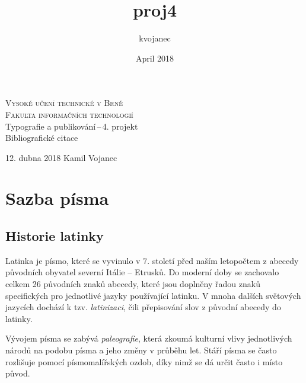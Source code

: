 \documentclass{article}
\title{proj4}
\author{kvojanec }
\date{April 2018}
\begin{document}
\begin{titlepage}
\begin{center}
\Huge
\textsc{\Huge{Vysoké učení technické v Brně} \\\huge Fakulta informačních technologií}\\
\LARGE Typografie a publikování\,--\,4. projekt\\
\Huge Bibliografické citace
\vfill
\end{center}
{\LARGE 12. dubna 2018 \hfill
Kamil Vojanec}

\end{titlepage}

\section{Sazba písma}
\subsection{Historie latinky} 
Latinka je písmo, které se vyvinulo v 7. století před naším letopočtem z abecedy původních obyvatel severní Itálie -- Etrusků. Do moderní doby se zachovalo celkem 26 původních znaků abecedy, které jsou doplněny řadou znaků specifických pro jednotlivé jazyky používající latinku.\cite{agersimon2018} V mnoha dalších světových jazycích dochází k tzv. \emph{latinizaci}, čili přepisování slov z původní abecedy do latinky.\cite{arutiunov2007} 

Vývojem písma se zabývá \emph{paleografie}, která zkoumá kulturní vlivy jednotlivých národů na podobu písma a jeho změny v průběhu let. Stáří písma se často rozlišuje pomocí písmomalířských ozdob, díky nimž se dá určit často i místo původ.\cite{joyce1957}
\end{document}
